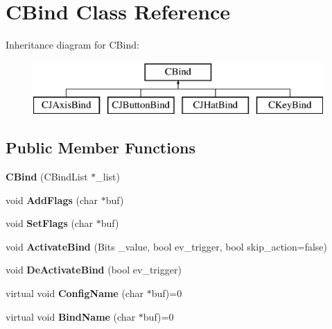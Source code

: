\hypertarget{classCBind}{\section{C\-Bind Class Reference}
\label{classCBind}
}
Inheritance diagram for C\-Bind\-:\begin{figure}[H]
\begin{center}
\leavevmode
\includegraphics[height=2.000000cm]{classCBind}
\end{center}
\end{figure}
\subsection*{Public Member Functions}
\begin{DoxyCompactItemize}
\item 
\hypertarget{classCBind_a95905cd7ff6329412ef8b57c13d9992b}{{\bfseries C\-Bind} (C\-Bind\-List $\ast$\-\_\-list)}\label{classCBind_a95905cd7ff6329412ef8b57c13d9992b}

\item 
\hypertarget{classCBind_aa0773aea4c2324cb3557bf543f8e26de}{void {\bfseries Add\-Flags} (char $\ast$buf)}\label{classCBind_aa0773aea4c2324cb3557bf543f8e26de}

\item 
\hypertarget{classCBind_a1ef5657b830e007e1391e3dd2e24bc4e}{void {\bfseries Set\-Flags} (char $\ast$buf)}\label{classCBind_a1ef5657b830e007e1391e3dd2e24bc4e}

\item 
\hypertarget{classCBind_ac1963875b6c478efc92bfa244937d24e}{void {\bfseries Activate\-Bind} (Bits \-\_\-value, bool ev\-\_\-trigger, bool skip\-\_\-action=false)}\label{classCBind_ac1963875b6c478efc92bfa244937d24e}

\item 
\hypertarget{classCBind_a5fcbf42fb58070fd1a81bf892dc73e1c}{void {\bfseries De\-Activate\-Bind} (bool ev\-\_\-trigger)}\label{classCBind_a5fcbf42fb58070fd1a81bf892dc73e1c}

\item 
\hypertarget{classCBind_a231fb0c4cc20ee05607f1e11b8b1189f}{virtual void {\bfseries Config\-Name} (char $\ast$buf)=0}\label{classCBind_a231fb0c4cc20ee05607f1e11b8b1189f}

\item 
\hypertarget{classCBind_aa9f00238cab696c93603043ca48d456e}{virtual void {\bfseries Bind\-Name} (char $\ast$buf)=0}\label{classCBind_aa9f00238cab696c93603043ca48d456e}

\end{DoxyCompactItemize}
